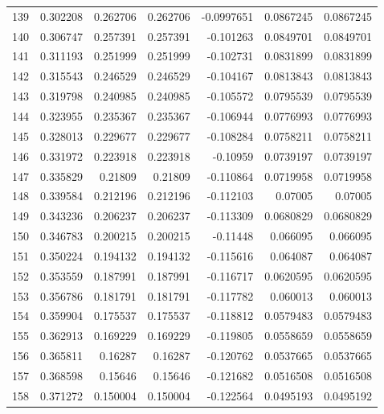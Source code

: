 \begin{tabular}{rrrrrrr}
 139 &  0.302208    & 0.262706    & 0.262706    & -0.0997651   & 0.0867245   & 0.0867245   \\
 140 &  0.306747    & 0.257391    & 0.257391    & -0.101263    & 0.0849701   & 0.0849701   \\
 141 &  0.311193    & 0.251999    & 0.251999    & -0.102731    & 0.0831899   & 0.0831899   \\
 142 &  0.315543    & 0.246529    & 0.246529    & -0.104167    & 0.0813843   & 0.0813843   \\
 143 &  0.319798    & 0.240985    & 0.240985    & -0.105572    & 0.0795539   & 0.0795539   \\
 144 &  0.323955    & 0.235367    & 0.235367    & -0.106944    & 0.0776993   & 0.0776993   \\
 145 &  0.328013    & 0.229677    & 0.229677    & -0.108284    & 0.0758211   & 0.0758211   \\
 146 &  0.331972    & 0.223918    & 0.223918    & -0.10959     & 0.0739197   & 0.0739197   \\
 147 &  0.335829    & 0.21809     & 0.21809     & -0.110864    & 0.0719958   & 0.0719958   \\
 148 &  0.339584    & 0.212196    & 0.212196    & -0.112103    & 0.07005     & 0.07005     \\
 149 &  0.343236    & 0.206237    & 0.206237    & -0.113309    & 0.0680829   & 0.0680829   \\
 150 &  0.346783    & 0.200215    & 0.200215    & -0.11448     & 0.066095    & 0.066095    \\
 151 &  0.350224    & 0.194132    & 0.194132    & -0.115616    & 0.064087    & 0.064087    \\
 152 &  0.353559    & 0.187991    & 0.187991    & -0.116717    & 0.0620595   & 0.0620595   \\
 153 &  0.356786    & 0.181791    & 0.181791    & -0.117782    & 0.060013    & 0.060013    \\
 154 &  0.359904    & 0.175537    & 0.175537    & -0.118812    & 0.0579483   & 0.0579483   \\
 155 &  0.362913    & 0.169229    & 0.169229    & -0.119805    & 0.0558659   & 0.0558659   \\
 156 &  0.365811    & 0.16287     & 0.16287     & -0.120762    & 0.0537665   & 0.0537665   \\
 157 &  0.368598    & 0.15646     & 0.15646     & -0.121682    & 0.0516508   & 0.0516508   \\
 158 &  0.371272    & 0.150004    & 0.150004    & -0.122564    & 0.0495193   & 0.0495192   \\

\end{tabular}
